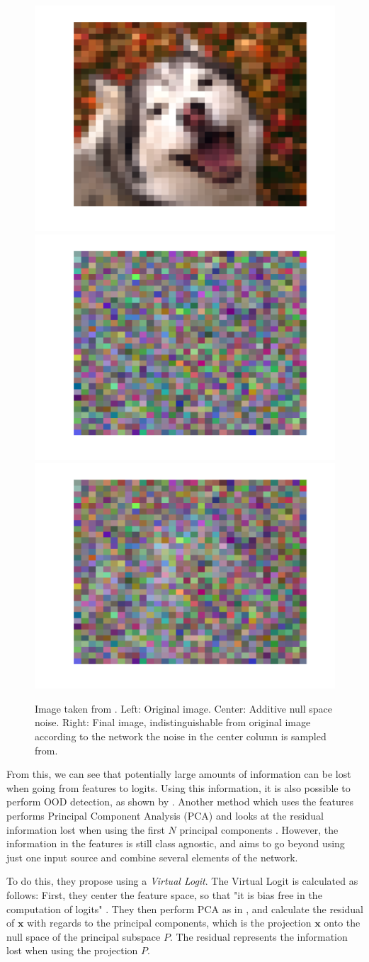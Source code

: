 \documentclass[UKenglish]{uiomasterthesis} %
\theoremstyle{definition}
\begin{document}
\begin{figure}[hbt]
    \centering
    \includegraphics[width=0.32\linewidth,trim={1.25cm 1.25cm 1.25cm 1.25cm},clip]{figure/OrigImage.pdf}
    \includegraphics[width=0.32\linewidth,trim={1.25cm 1.25cm 1.25cm 1.25cm},clip]{figure/PureNoise.pdf}
    \includegraphics[width=0.32\linewidth,trim={1.25cm 1.25cm 1.25cm 1.25cm},clip]{figure/NoiseAdded.pdf}
    \caption{Image taken from \cite{nusa}. Left: Original image. Center: Additive null space noise. Right: Final image, indistinguishable from original image according to the network the noise in the center column is sampled from.}
    \label{dog}
\end{figure}

From this, we can see that potentially large amounts of information can be lost when going from features to logits. Using this information, it is also possible to perform OOD detection, as shown by \cite{nusa}. Another method which uses the features performs Principal Component Analysis (PCA) and looks at the residual information lost when using the first $N$ principal components \cite{subspace}. However, the information in the features is still class agnostic, and \cite{vim} aims to go beyond using just one input source and combine several elements of the network.

To do this, they propose using a {\it Virtual Logit}. The Virtual Logit is calculated as follows: First, they center the feature space, so that "it is bias free in the computation of logits" \cite{vim}. They then perform PCA as in \cite{subspace}, and calculate the residual of $\bm{x}$ with regards to the principal components, which is the projection $\bm{x}$ onto the null space of the principal subspace $P$. The residual represents the information lost when using the projection $P$.
\end{document}
